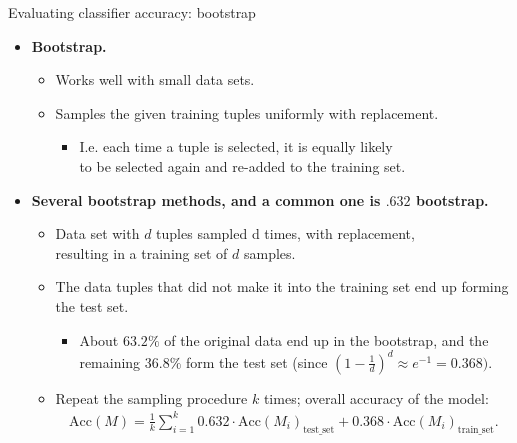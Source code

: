 \documentclass[aspectratio=169,t,table]{beamer}
\begin{document}
  {
    \begin{frame}{Evaluating classifier accuracy: bootstrap}
      \begin{itemize}
        \item \textbf{Bootstrap.}
        \begin{itemize}
          \item Works well with small data sets.
          \item Samples the given training tuples uniformly with replacement.
          \begin{itemize}
            \item I.e. each time a tuple is selected, it is equally likely \\
            to be selected again and re-added to the training set.
          \end{itemize}
        \end{itemize}
        \item \textbf{Several bootstrap methods, and a common one is $.632$ bootstrap.}
        \begin{itemize}
          \item Data set with $d$ tuples sampled d times, with replacement, \\
          resulting in a training set of $d$ samples.
          \item The data tuples that did not make it into the training set end up forming the test set.
          \begin{itemize}
            \item About $63.2\%$ of the original data end up in the bootstrap, and the remaining $36.8\%$ form the test set (since $(1-\frac{1}{d})^d \approx e^{-1} = 0.368)$.
          \end{itemize}
          \item Repeat the sampling procedure $k$ times; overall accuracy of the model:
          \begin{align}
            \text{Acc}(M) = \frac{1}{k} \sum_{i=1}^{k} 0.632 \cdot \text{Acc}(M_i)_{\text{test\_set}} + 0.368 \cdot \text{Acc}(M_i)_{\text{train\_set}}.
          \end{align}
        \end{itemize}
      \end{itemize}
    \end{frame}
  }
\end{document}
